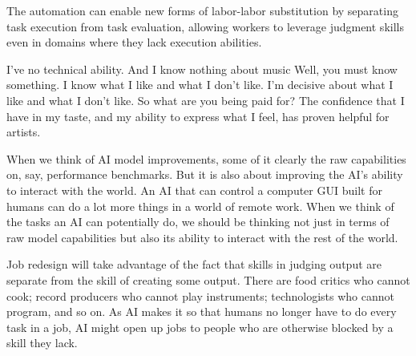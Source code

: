 \documentclass{article}
\begin{document}
The automation can enable new forms of labor-labor substitution by separating task execution from task evaluation, allowing workers to leverage judgment skills even in domains where they lack execution abilities.
\begin{dialogue}
     I've no technical ability. And I know nothing about music
     Well, you must know something.
     I know what I like and what I don't like. I'm decisive about what I like and what I don't like.
     So what are you being paid for?
     The confidence that I have in my taste, and my ability to express what I feel, has proven helpful for artists.
  \end{dialogue}
  
When we think of AI model improvements, some of it clearly the raw capabilities on, say, performance benchmarks. 
But it is also about improving the AI's ability to interact with the world. 
An AI that can control a computer GUI built for humans can do a lot more things in a world of remote work.
When we think of the tasks an AI can potentially do, we should be thinking not just in terms of raw model capabilities but also its ability to interact with the rest of the world.

Job redesign will take advantage of the fact that skills in judging output are separate from the skill of creating some output.
There are food critics who cannot cook; record producers who cannot play instruments; technologists who cannot program, and so on.
As AI makes it so that humans no longer have to do every task in a job, AI might open up jobs to people who are otherwise blocked by a skill they lack.






\end{document}

